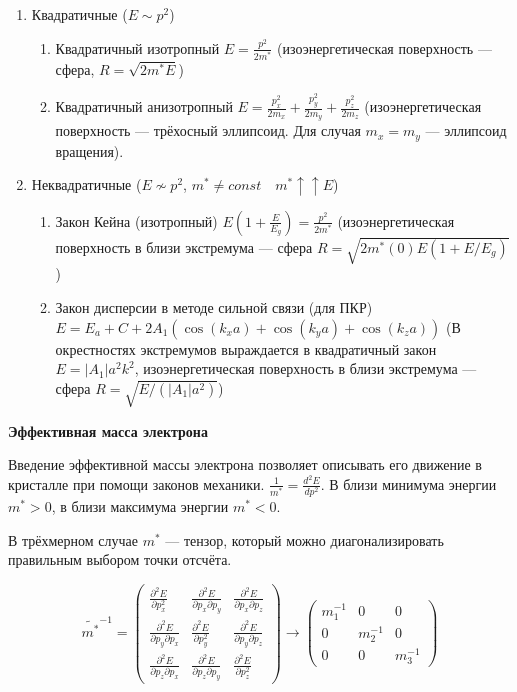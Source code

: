 \begin{enumerate}
    \item Квадратичные ($E \sim p^2$)
    \begin{enumerate}
        \item Квадратичный изотропный $E=\frac{p^2}{2 m^*}$ (изоэнергетическая поверхность --- сфера, $R=\sqrt{2m^*E}$)
        \item Квадратичный анизотропный $E=\frac{p_x^2}{2 m_x}+\frac{p_y^2}{2 m_y}+\frac{p_z^2}{2 m_z}$ (изоэнергетическая поверхность --- трёхосный эллипсоид. Для случая $m_x=m_y$ --- эллипсоид вращения).
    \end{enumerate}
    \item Неквадратичные ($E \nsim p^2$, $m^* \neq const \quad m^* \uparrow \uparrow E$)
    \begin{enumerate}
        \item Закон Кейна (изотропный) $E(1+\frac{E}{E_g})=\frac{p^2}{2m^*}$ (изоэнергетическая поверхность в близи экстремума --- сфера $R=\sqrt{2m^*(0)E(1+E/E_g)}$)
        \item Закон дисперсии в методе сильной связи (для ПКР) $E=E_a+C+2 A_1\left(\cos \left(k_x a\right)+\cos \left(k_y a\right)+\cos \left(k_z a\right)\right)$ (В окрестностях экстремумов выраждается в квадратичный закон $E=|A_1|a^2k^2$, изоэнергетическая поверхность в близи экстремума --- сфера $R=\sqrt{E/(|A_1|a^2)}$)
    \end{enumerate}
\end{enumerate}

\textbf{Эффективная масса электрона}

Введение эффективной массы электрона позволяет описывать его движение в кристалле при помощи законов механики. $\displaystyle \frac{1}{m^*} = \frac{d^2E}{dp^2}$. В близи минимума энергии $m^*>0$, в близи максимума энергии $m^*<0$. 

В трёхмерном случае $m^*$ --- тензор, который можно диагонализировать правильным выбором точки отсчёта.


$$
    \widetilde{m^*}^{-1}=\left(\begin{array}{ccc}
    \frac{\partial^2 E}{\partial p_x^2} & \frac{\partial^2 E}{\partial p_x \partial p_y} & \frac{\partial^2 E}{\partial p_x \partial p_z} \\
    \frac{\partial^2 E}{\partial p_y \partial p_x} & \frac{\partial^2 E}{\partial p_y^2} & \frac{\partial^2 E}{\partial p_y \partial p_z} \\
    \frac{\partial^2 E}{\partial p_z \partial p_x} & \frac{\partial^2 E}{\partial p_z \partial p_y} & \frac{\partial^2 E}{\partial p_z^2}
    \end{array}\right) \rightarrow \left(\begin{array}{ccc} m_1^{-1} & 0 & 0 \\ 0 & m_2^{-1} & 0 \\ 0 & 0 & m_3^{-1} \end{array}\right)
$$

